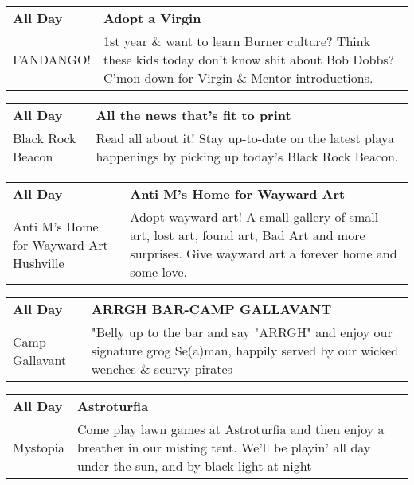 \begin{tabular}{ p{1in} p{2.2in} }
    \textbf{All Day} & \textbf{Adopt a Virgin} \\
    FANDANGO! \newline  & 1st year \& want to learn Burner culture? Think these kids today don't know shit about Bob Dobbs? C'mon down for Virgin \& Mentor introductions. \\
    \hline 
\end{tabular}
    
\begin{tabular}{ p{1in} p{2.2in} }
    \textbf{All Day} & \textbf{All the news that's fit to print} \\
    Black Rock Beacon \newline  & Read all about it! Stay up-to-date on the latest playa happenings by picking up today's Black Rock Beacon. \\
    \hline 
\end{tabular}
    
\begin{tabular}{ p{1in} p{2.2in} }
    \textbf{All Day} & \textbf{Anti M's Home for Wayward Art} \\
    Anti M's Home for Wayward Art \newline Hushville & Adopt wayward art! A small gallery of small art, lost art, found art, Bad Art and more surprises.  Give wayward art a forever home and some love. \\
    \hline 
\end{tabular}
    
\begin{tabular}{ p{1in} p{2.2in} }
    \textbf{All Day} & \textbf{ARRGH BAR-CAMP GALLAVANT} \\
    Camp Gallavant \newline  & "Belly up to the bar and say "ARRGH" and enjoy our signature grog Se(a)man, happily served by our wicked wenches \& scurvy pirates \\
    \hline 
\end{tabular}
    
\begin{tabular}{ p{1in} p{2.2in} }
    \textbf{All Day} & \textbf{Astroturfia} \\
    Mystopia \newline  & Come play lawn games at Astroturfia and then enjoy a breather in our misting tent. We'll be playin' all day under the sun, and by black light at night \\
    \hline 
\end{tabular}
    
